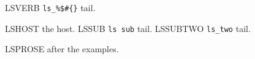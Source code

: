 

\ea LSVERB \verb|ls_%$#{}| tail.
\z

\ea LSHOST the host.
  \ea LSSUB \verb*|ls sub| tail.
  \ex LSSUBTWO \verb|ls_two| tail.
  \z
\z

LSPROSE after the examples.

